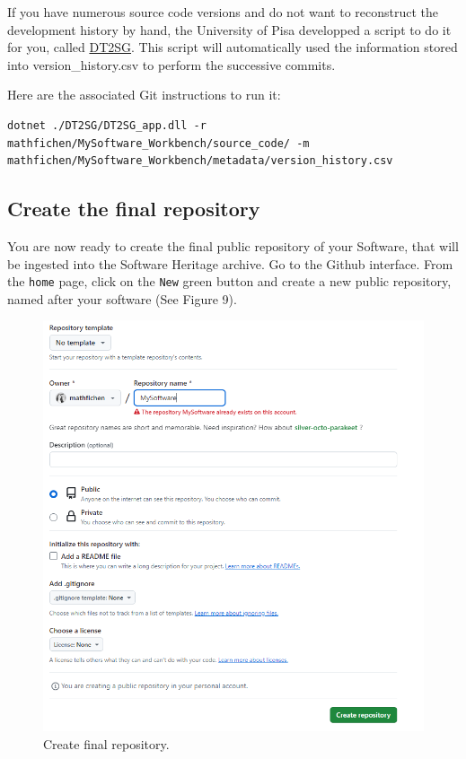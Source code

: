 \documentclass[]{article}
\newcommand{\passthrough}[1]{#1}
\begin{document}
If you have numerous source code versions and do not want to reconstruct
the development history by hand, the University of Pisa developped a
script to do it for you, called
\href{https://github.com/Unipisa/DT2SG}{DT2SG}. This script will
automatically used the information stored into version\_history.csv to
perform the successive commits.

Here are the associated Git instructions to run it:

\begin{lstlisting}
dotnet ./DT2SG/DT2SG_app.dll -r mathfichen/MySoftware_Workbench/source_code/ -m mathfichen/MySoftware_Workbench/metadata/version_history.csv
\end{lstlisting}

\hypertarget{create-the-final-repository}{%
\subsection{Create the final
repository}\label{create-the-final-repository}}

You are now ready to create the final public repository of your
Software, that will be ingested into the Software Heritage archive. Go
to the Github interface. From the \passthrough{\lstinline!home!} page,
click on the \passthrough{\lstinline!New!} green button and create a new
public repository, named after your software (See Figure 9).

\begin{figure}
\hypertarget{fig:FinalRepo}{%
\centering
\includegraphics{./media2/17_Finalrepo.png}
\caption{Create final repository.}\label{fig:FinalRepo}
}
\end{figure}
\end{document}
